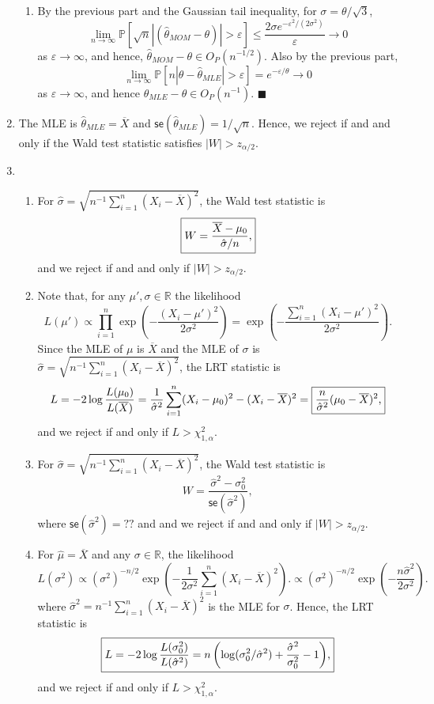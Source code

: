 \documentclass[11pt]{article}
\renewcommand{\qed}{\quad \ensuremath{\blacksquare}}
\newcommand{\inv}{^{-1}}
\newcommand{\R}{\mathbb{R}} %
\newcommand{\e}{\varepsilon} %
\renewcommand{\P}{\mathbb{P}}   %
\newcommand{\ol}{\overline}
\begin{document}
\begin{enumerate}
\begin{enumerate}
\item By the previous part and the Gaussian tail inequality, for
$\sigma = \theta/\sqrt{3}$,
\[\lim_{n \to \infty}
    \P\left[\sqrt{n}|(\hat\theta_{MOM} - \theta)| > \e\right]
    \leq \frac{2\sigma e^{-\e^2/(2\sigma^2)}}{\e}
    \to 0
\]
as $\e \to \infty$, and hence, $\hat\theta_{MOM} - \theta \in O_P(n^{-1/2})$.
Also by the previous part,
\[\lim_{n \to \infty}
    \P\left[ n|\theta - \hat\theta_{MLE}| > \e\right]
    = e^{-\e/\theta}
    \to 0
\]
as $\e \to \infty$, and hence $\hat\theta_{MLE} - \theta \in O_P(n^{-1})$. \qed
\end{enumerate}

\item The MLE is $\hat\theta_{MLE} = \ol X$ and
$\mathsf{se}\left( \hat\theta_{MLE} \right) = 1/\sqrt{n}$. Hence, we reject if
and and only if the Wald test statistic
\fbox{$\displaystyle W = \sqrt{n} \left( \ol X - \mu_0 \right)$,} satisfies
$|W| > z_{\alpha/2}$.

\item
\begin{enumerate}
\item For $\hat\sigma = \sqrt{n\inv \sum_{i = 1}^n (X_i - \ol X)^2}$, the Wald
test statistic is
\[\mbox{\fbox{$\displaystyle W = \frac{\ol X - \mu_0}{\hat\sigma/n}$,}}\]
and we reject if and and only if $|W| > z_{\alpha/2}$.
\item Note that, for any $\mu', \sigma \in \R$ the likelihood
\[L(\mu')
    \propto \prod_{i = 1}^n \exp\left( - \frac{(X_i - \mu')^2}{2\sigma^2} \right)
    = \exp\left( - \frac{\sum_{i = 1}^n (X_i - \mu')^2}{2\sigma^2} \right).
\]
Since the MLE of $\mu$ is $\ol X$ and the MLE of $\sigma$ is
$\hat\sigma = \sqrt{n\inv \sum_{i = 1}^n (X_i - \ol X)^2}$, the LRT statistic is
\[L
    = -2 \log \frac{L(\mu_0)}{L(\ol X)}
    = \frac{1}{\hat\sigma^2} \sum_{i = 1}^n (X_i - \mu_0)^2 - (X_i - \ol X)^2
    = \mbox{\fbox{$\displaystyle \frac{n}{\hat\sigma^2} (\mu_0 - \ol X)^2$,}}
\]
and we reject if and only if $L > \chi^2_{1,\alpha}$.
\item For $\hat\sigma = \sqrt{n\inv \sum_{i = 1}^n (X_i - \ol X)^2}$, the Wald
test statistic is
\[W = \frac{\hat\sigma^2 - \sigma_0^2}{\mathsf{se}(\hat\sigma^2)},\]
where $\mathsf{se}(\hat\sigma^2) = ??$ and and we reject if and and only if
$|W| > z_{\alpha/2}$.
\item For $\hat\mu = \ol X$ and any $\sigma \in \R$, the likelihood
\[L(\sigma^2)
    \propto (\sigma^2)^{-n/2}
        \exp\left( -\frac{1}{2\sigma^2} \sum_{i = 1}^n (X_i - \ol X)^2 \right).
    \propto (\sigma^2)^{-n/2}
        \exp\left( -\frac{n\hat\sigma^2}{2\sigma^2} \right).
\]
where $\hat\sigma^2 = n\inv \sum_{i = 1}^n (X_i - \ol X)^2$ is the MLE for
$\sigma$. Hence, the LRT statistic is
\[\mbox{\fbox{$\displaystyle L
    = -2 \log \frac{L(\sigma_0^2)}{L(\hat\sigma^2)}
    = n\left( \log(\sigma_0^2/\hat\sigma^2)
    + \frac{\hat\sigma^2}{\sigma_0^2} - 1 \right)$,}}
\]
and we reject if and only if $L > \chi^2_{1,\alpha}$.
\end{enumerate}
\end{enumerate}
\end{document}
